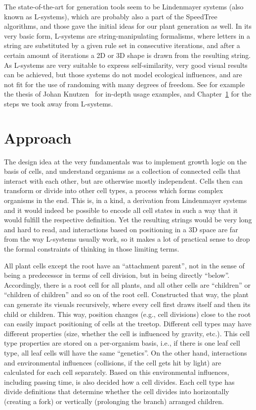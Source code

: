 \documentclass[11pt, abstract=on]{scrartcl}
\begin{document}
The state-of-the-art for generation tools seem to be Lindenmayer systems (also known as L-systems), which are probably also a part of the SpeedTree algorithms, and those gave the initial ideas for our plant generation as well. In its very basic form, L-systems are string-manipulating formalisms, where letters in a string are substituted by a given rule set in consecutive iterations, and after a certain amount of iterations a 2D or 3D shape is drawn from the resulting string. As L-systems are very suitable to express self-similarity, very good visual results can be achieved, but those systems do not model ecological influences, and are not fit for the use of randoming with many degrees of freedom. See for example the thesis of Johan Knutzen~\cite{ClimbingPlants} for in-depth usage examples, and Chapter~\ref{cpt:ImplGeneral} for the steps we took away from L-systems.

\section{Approach}\label{cpt:ImplGeneral}
The design idea at the very fundamentals was to implement growth logic on the basis of cells, and understand organisms as a collection of connected cells that interact with each other, but are otherwise mostly independent. Cells then can transform or divide into other cell types, a process which forms complex organisms in the end. This is, in a kind, a derivation from Lindenmayer systems and it would indeed be possible to encode all cell states in such a way that it would fulfill the respective definition. Yet the resulting strings would be very long and hard to read, and interactions based on positioning in a 3D space are far from the way L-systems usually work, so it makes a lot of practical sense to drop the formal constraints of thinking in those limiting terms. 

All plant cells except the root have an ``attachment parent'', not in the sense of being a predecessor in terms of cell division, but in being directly ``below''. Accordingly, there is a root cell for all plants, and all other cells are ``children'' or ``children of children'' and so on of the root cell. Constructed that way, the plant can generate its visuals recursively, where every cell first draws itself and then its child or children. This way, position changes (e.g., cell divisions) close to the root can easily impact positioning of cells at the treetop. Different cell types may have different properties (size, whether the cell is influenced by gravity, etc.). This cell type properties are stored on a per-organism basis, i.e., if there is one leaf cell type, all leaf cells will have the same ``genetics''. On the other hand, interactions and environmental influences (collisions, if the cell gets hit by light) are calculated for each cell separately. Based on this environmental influences, including passing time, is also decided how a cell divides. Each cell type has divide definitions that determine whether the cell divides into horizontally (creating a fork) or vertically (prolonging the branch) arranged children.
\end{document}
